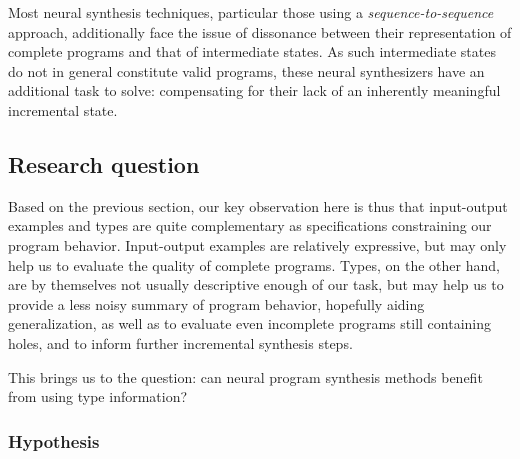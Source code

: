 \documentclass{article} %
\begin{document}

Most neural synthesis techniques, particular those using a \emph{sequence-to-sequence} approach,
additionally face the issue of dissonance between their representation of complete programs and that of intermediate states.
As such intermediate states do not in general constitute valid programs,
these neural synthesizers have an additional task to solve:
compensating for their lack of an inherently meaningful incremental state.

\subsection{Research question}


Based on the previous section,
our key observation here is thus that input-output examples and types are
quite complementary as specifications constraining our program behavior.
Input-output examples are relatively expressive,
but may only help us to evaluate the quality of complete programs.
Types, on the other hand, are by themselves not usually descriptive enough of our task,
but may help us to provide a less noisy summary of program behavior, hopefully aiding generalization,
as well as to evaluate even incomplete programs still containing holes,
and to inform further incremental synthesis steps.

This brings us to the question:
        can neural program synthesis methods benefit from using type information?

\subsubsection{Hypothesis}
\end{document}
